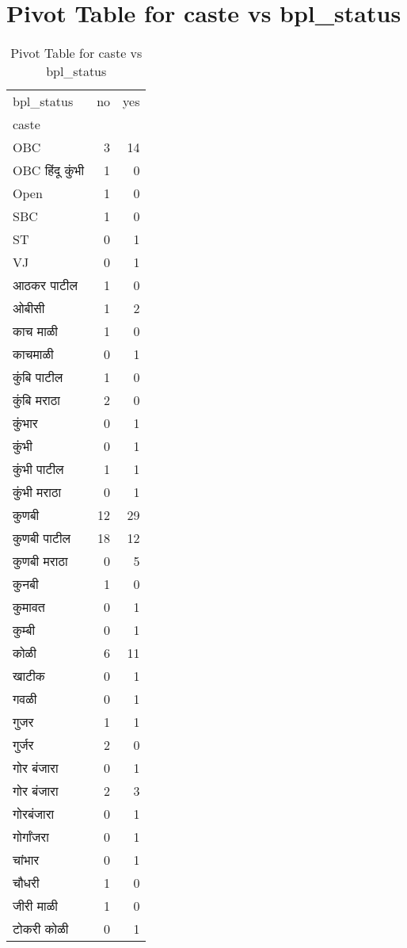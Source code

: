 \documentclass{article}
\begin{document}
\section{Pivot Table for caste vs bpl_status}
\begin{table}
\caption{Pivot Table for caste vs bpl_status}
\label{tab:caste_bpl_status}
\begin{tabular}{lrr}
\toprule
bpl_status & no & yes \\
caste &  &  \\
\midrule
OBC & 3 & 14 \\
OBC हिंदू कुंभी & 1 & 0 \\
Open & 1 & 0 \\
SBC & 1 & 0 \\
ST & 0 & 1 \\
VJ & 0 & 1 \\
आठकर पाटील & 1 & 0 \\
ओबीसी & 1 & 2 \\
काच माळी & 1 & 0 \\
काचमाळी & 0 & 1 \\
कुंबि पाटील & 1 & 0 \\
कुंबि मराठा & 2 & 0 \\
कुंभार & 0 & 1 \\
कुंभी & 0 & 1 \\
कुंभी पाटील & 1 & 1 \\
कुंभी मराठा & 0 & 1 \\
कुणबी & 12 & 29 \\
कुणबी पाटील & 18 & 12 \\
कुणबी मराठा & 0 & 5 \\
कुनबी & 1 & 0 \\
कुमावत & 0 & 1 \\
कुम्बी & 0 & 1 \\
कोळी & 6 & 11 \\
खाटीक & 0 & 1 \\
गवळी & 0 & 1 \\
गुजर & 1 & 1 \\
गुर्जर & 2 & 0 \\
गोर  बंजारा & 0 & 1 \\
गोर बंजारा & 2 & 3 \\
गोरबंजारा & 0 & 1 \\
गोर्गांजरा & 0 & 1 \\
चांभार & 0 & 1 \\
चौधरी & 1 & 0 \\
जीरी माळी & 1 & 0 \\
टोकरी कोळी & 0 & 1 \\

\end{tabular}
\end{table}
\end{document}
